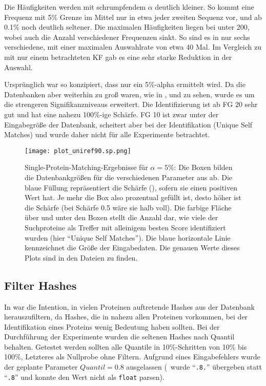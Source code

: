         Die Häufigkeiten werden mit schrumpfendem $\alpha$ deutlich kleiner. So kommt eine Frequenz mit 5\% Grenze im Mittel nur in etwa jeder zweiten Sequenz vor, und ab 0.1\% noch deutlich seltener. Die maximalen Häufigkeiten liegen bei unter 200, wobei auch die Anzahl verschiedener Frequenzen sinkt. So sind es in  nur sechs verschiedene, mit einer maximalen Auswahlrate von etwa 40 Mal. Im Vergleich zu  mit nur einem betrachteten \ac{KF} gab es eine sehr starke Reduktion in der Auswahl.

        Ursprünglich war  so konzipiert, dass nur ein 5\%-alpha ermittelt wird. Da die Datenbanken aber weiterhin zu groß waren, wie in ,  und  zu sehen, wurde es um die strengeren Signifikanzniveaus erweitert. Die Identifizierung ist ab \ac{FG} 20 sehr gut und hat eine nahezu 100\%-ige Schärfe. \ac{FG} 10 ist zwar unter der Eingabegröße der Datenbank, scheitert aber bei der Identifikation (Unique Self Matches) und wurde daher nicht für alle Experimente betrachtet. 

        \begin{figure}[H]
            \centering
            \texttt{[image: plot\_uniref90.sp.png]}
            \caption[Single-Protein-Matching ]{Single-Protein-Matching-Ergebnisse für $\alpha=5\%$: Die Boxen bilden die Datenbankgrößen für die verschiedenen Parameter aus  ab. Die blaue Füllung repräsentiert die Schärfe (), sofern sie einen positiven Wert hat. Je mehr die Box also prozentual gefüllt ist, desto höher ist die Schärfe (bei Schärfe 0.5 wäre sie halb voll). Die farbige Fläche über und unter den Boxen stellt die Anzahl dar, wie viele der Suchproteine als Treffer mit alleinigem besten Score identifiziert wurden (hier ``Unique Self Matches''). Die blaue horizontale Linie kennzeichnet die Größe der Eingabedaten. Die genauen Werte dieses Plots sind in den Dateien  zu finden.}
            \label{fig:uniref90.sp}
        \end{figure}
    \subsection{Filter Hashes} %
        \label{sub:filter_results}
        In  war die Intention, in vielen Proteinen auftretende Hashes aus der Datenbank herauszufiltern, da Hashes, die in nahezu allen Proteinen vorkommen, bei der Identifikation eines Proteins wenig Bedeutung haben sollten. Bei der Durchführung der Experimente wurden die seltenen Hashes nach Quantil behalten. Getestet werden sollten alle Quantile in 10\%-Schritten von 10\% bis 100\%, Letzteres als Nullprobe ohne Filtern. Aufgrund eines Eingabefehlers wurde der geplante Parameter $Quantil=0.8$ ausgelassen (\protfin\ wurde ``\texttt{.8.}'' übergeben statt ``\texttt{.8}'' und konnte den Wert nicht als \texttt{float} parsen).

